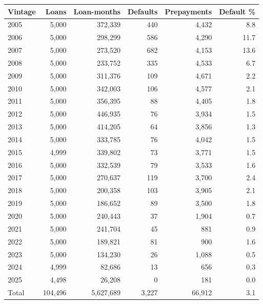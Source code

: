 \begin{tabular}{lrrrrr}
\toprule
Vintage & Loans & Loan-months & Defaults & Prepayments & Default \% \\
\midrule
2005 & 5,000 & 372,339 & 440 & 4,432 & 8.8 \\
2006 & 5,000 & 298,299 & 586 & 4,290 & 11.7 \\
2007 & 5,000 & 273,520 & 682 & 4,153 & 13.6 \\
2008 & 5,000 & 233,752 & 335 & 4,533 & 6.7 \\
2009 & 5,000 & 311,376 & 109 & 4,671 & 2.2 \\
2010 & 5,000 & 342,003 & 106 & 4,577 & 2.1 \\
2011 & 5,000 & 356,395 & 88 & 4,405 & 1.8 \\
2012 & 5,000 & 446,935 & 76 & 3,934 & 1.5 \\
2013 & 5,000 & 414,205 & 64 & 3,856 & 1.3 \\
2014 & 5,000 & 333,785 & 76 & 4,042 & 1.5 \\
2015 & 4,999 & 339,802 & 73 & 3,771 & 1.5 \\
2016 & 5,000 & 332,539 & 79 & 3,533 & 1.6 \\
2017 & 5,000 & 270,637 & 119 & 3,700 & 2.4 \\
2018 & 5,000 & 200,358 & 103 & 3,905 & 2.1 \\
2019 & 5,000 & 186,652 & 89 & 3,500 & 1.8 \\
2020 & 5,000 & 240,443 & 37 & 1,904 & 0.7 \\
2021 & 5,000 & 241,704 & 45 & 881 & 0.9 \\
2022 & 5,000 & 189,821 & 81 & 900 & 1.6 \\
2023 & 5,000 & 134,230 & 26 & 1,088 & 0.5 \\
2024 & 4,999 & 82,686 & 13 & 656 & 0.3 \\
2025 & 4,498 & 26,208 & 0 & 181 & 0.0 \\
\midrule
Total & 104,496 & 5,627,689 & 3,227 & 66,912 & 3.1 \\
\bottomrule
\end{tabular}
